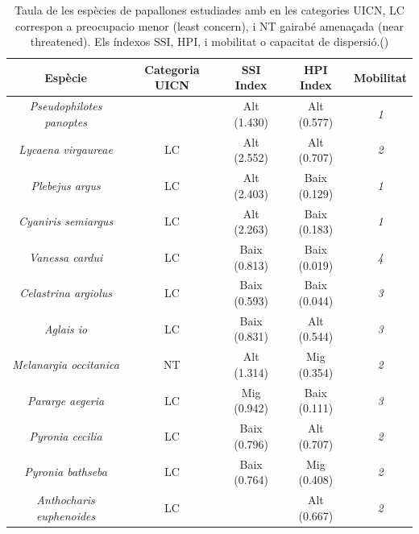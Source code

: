 \documentclass{article}
\begin{document}
\begin{table}[h]
  \centering
  \begin{tabular}{|c|c|c|c|c|}
    \hline
    Espècie & Categoria UICN &SSI Index & HPI Index  & Mobilitat\\ \hline
    \textit{Pseudophilotes panoptes} & \color{red}{LC} & Alt (1.430) & Alt (0.577) & \textit{1}\\ \hline
    \textit{Lycaena virgaureae} & LC & Alt (2.552) & Alt  (0.707) & \textit{2}\\ \hline
    \textit{Plebejus argus} &  LC & Alt (2.403) & Baix (0.129) & \textit{1}\\ \hline
    \textit{Cyaniris semiargus} & LC & Alt (2.263) & Baix (0.183) & \textit{1}\\ \hline
    \textit{Vanessa cardui} & LC & Baix (0.813) & Baix (0.019) & \textit{4}\\ \hline
    \textit{Celastrina argiolus} & LC & Baix (0.593) & Baix (0.044)& \textit{3}\\ \hline
    \textit{Aglais io} & LC & Baix (0.831) & Alt (0.544) & \textit{3}\\ \hline
    \textit{Melanargia occitanica} & NT & Alt (1.314) & Mig (0.354) & \textit{2}\\ \hline
    \textit{Pararge aegeria} & LC & Mig (0.942) & Baix (0.111) & \textit{3}\\ \hline
    \textit{Pyronia cecilia} & LC & Baix (0.796) & Alt (0.707) & \textit{2}\\ \hline
    \textit{Pyronia bathseba} & LC & Baix (0.764) & Mig (0.408) & \textit{2}\\ \hline
    \textit{Anthocharis euphenoides} & LC & \color{red}{Mig (0.652)} & Alt (0.667) & \textit{2}\\ \hline
  \end{tabular}
  \caption{Taula de les esp\`ecies de papallones estudiades amb en les categories UICN, LC correspon a preocupacio menor (least concern), i NT gairabé amenaçada (near threatened). Els índexos SSI, HPI, i mobilitat o capacitat de dispersi\'o.(\cite{ubach2025})}
  \label{tab:species_indices}
\end{table}
\end{document}
